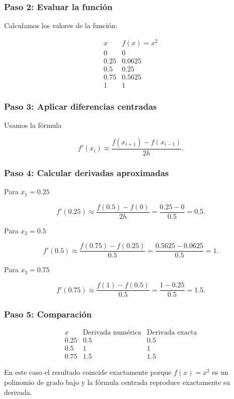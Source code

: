 \documentclass[12pt,a4paper]{article}
\theoremstyle{definition}
\theoremstyle{remark}
\begin{document}
\subsubsection*{Paso 2: Evaluar la función}

Calculamos los valores de la función:

\[
\begin{array}{c|c}
x & f(x)=x^2 \\
\hline
0 & 0 \\
0.25 & 0.0625 \\
0.5 & 0.25 \\
0.75 & 0.5625 \\
1 & 1
\end{array}
\]

\subsubsection*{Paso 3: Aplicar diferencias centradas}

Usamos la fórmula

\[
f'(x_i)\approx
\frac{f(x_{i+1})-f(x_{i-1})}{2h}.
\]

\subsubsection*{Paso 4: Calcular derivadas aproximadas}

Para $x_1=0.25$

\[
f'(0.25)\approx
\frac{f(0.5)-f(0)}{2h}
=
\frac{0.25-0}{0.5}
=
0.5.
\]

Para $x_2=0.5$

\[
f'(0.5)\approx
\frac{f(0.75)-f(0.25)}{0.5}
=
\frac{0.5625-0.0625}{0.5}
=
1.
\]

Para $x_3=0.75$

\[
f'(0.75)\approx
\frac{f(1)-f(0.5)}{0.5}
=
\frac{1-0.25}{0.5}
=
1.5.
\]

\subsubsection*{Paso 5: Comparación}

\[
\begin{array}{c|c|c}
x & \text{Derivada numérica} & \text{Derivada exacta} \\
\hline
0.25 & 0.5 & 0.5 \\
0.5 & 1 & 1 \\
0.75 & 1.5 & 1.5
\end{array}
\]

En este caso el resultado coincide exactamente porque $f(x)=x^2$
es un polinomio de grado bajo y la fórmula centrada reproduce
exactamente su derivada.
\end{document}
